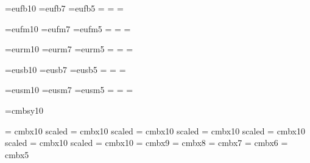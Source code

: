 

\font\teneufb=eufb10
\font\seveneufb=eufb7
\font\fiveeufb=eufb5
\newfam\eufbfam
\textfont\eufbfam=\teneufb
\scriptfont\eufbfam=\seveneufb
\scriptscriptfont\eufbfam=\fiveeufb
\def\eufb#1{{\fam\eufbfam\relax#1}}

\font\teneufm=eufm10
\font\seveneufm=eufm7
\font\fiveeufm=eufm5
\newfam\eufmfam
\textfont\eufmfam=\teneufm
\scriptfont\eufmfam=\seveneufm
\scriptscriptfont\eufmfam=\fiveeufm
\def\eufm#1{{\fam\eufmfam\relax#1}}

\font\teneurm=eurm10
\font\seveneurm=eurm7
\font\fiveeurm=eurm5
\newfam\eurmfam
\textfont\eurmfam=\teneurm
\scriptfont\eurmfam=\seveneurm
\scriptscriptfont\eurmfam=\fiveeurm
\def\eurm#1{{\fam\eurmfam\relax#1}}

\font\teneusb=eusb10
\font\seveneusb=eusb7
\font\fiveeusb=eusb5
\newfam\eusbfam
\textfont\eusbfam=\teneusb
\scriptfont\eusbfam=\seveneusb
\scriptscriptfont\eusbfam=\fiveeusb
\def\eusb#1{{\fam\eusbfam\relax#1}}

\font\teneusm=eusm10
\font\seveneusm=eusm7
\font\fiveeusm=eusm5
\newfam\eusmfam
\textfont\eusmfam=\teneusm
\scriptfont\eusmfam=\seveneusm
\scriptscriptfont\eusmfam=\fiveeusm
\def\eusm#1{{\fam\eusmfam\relax#1}}

\font \tenbsy=cmbsy10

\font \twentyfourbf = cmbx10 scaled 
\font \twentybf = cmbx10 scaled 
\font \seventeenbf = cmbx10 scaled 
\font \fourteenbf = cmbx10 scaled 
\font \twelvebf = cmbx10 scaled 
\font \elevenbf = cmbx10 scaled \magstephalf
\font \tenbf = cmbx10
\font \ninebf = cmbx9
\font \eightbf = cmbx8
\font \sevenbf = cmbx7
\font \sixbf = cmbx6
\font \fivebf = cmbx5

